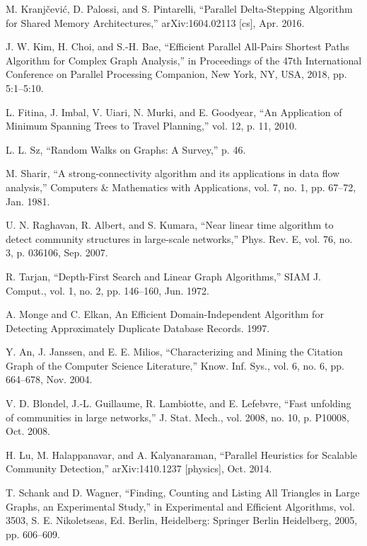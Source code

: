\documentclass[journal,twoside,web]{ieeecolor}
\begin{document}
\begin{thebibliography}{9}
    M. Kranjčević, D. Palossi, and S. Pintarelli, “Parallel Delta-Stepping Algorithm for Shared Memory Architectures,” arXiv:1604.02113 [cs], Apr. 2016.
    
    J. W. Kim, H. Choi, and S.-H. Bae, “Efficient Parallel All-Pairs Shortest Paths Algorithm for Complex Graph Analysis,” in Proceedings of the 47th International Conference on Parallel Processing Companion, New York, NY, USA, 2018, pp. 5:1–5:10.
    
    L. Fitina, J. Imbal, V. Uiari, N. Murki, and E. Goodyear, “An Application of Minimum Spanning Trees to Travel Planning,” vol. 12, p. 11, 2010.
    
    L. L. Sz, “Random Walks on Graphs: A Survey,” p. 46.
    
    M. Sharir, “A strong-connectivity algorithm and its applications in data flow analysis,” Computers \& Mathematics with Applications, vol. 7, no. 1, pp. 67–72, Jan. 1981.
    
    U. N. Raghavan, R. Albert, and S. Kumara, “Near linear time algorithm to detect community structures in large-scale networks,” Phys. Rev. E, vol. 76, no. 3, p. 036106, Sep. 2007.
    
    R. Tarjan, “Depth-First Search and Linear Graph Algorithms,” SIAM J. Comput., vol. 1, no. 2, pp. 146–160, Jun. 1972.
    
    A. Monge and C. Elkan, An Efficient Domain-Independent Algorithm for Detecting Approximately Duplicate Database Records. 1997.
    
    Y. An, J. Janssen, and E. E. Milios, “Characterizing and Mining the Citation Graph of the Computer Science Literature,” Know. Inf. Sys., vol. 6, no. 6, pp. 664–678, Nov. 2004.
    
    V. D. Blondel, J.-L. Guillaume, R. Lambiotte, and E. Lefebvre, “Fast unfolding of communities in large networks,” J. Stat. Mech., vol. 2008, no. 10, p. P10008, Oct. 2008.
    
    H. Lu, M. Halappanavar, and A. Kalyanaraman, “Parallel Heuristics for Scalable Community Detection,” arXiv:1410.1237 [physics], Oct. 2014.
    
    T. Schank and D. Wagner, “Finding, Counting and Listing All Triangles in Large Graphs, an Experimental Study,” in Experimental and Efficient Algorithms, vol. 3503, S. E. Nikoletseas, Ed. Berlin, Heidelberg: Springer Berlin Heidelberg, 2005, pp. 606–609.
    

\end{thebibliography}
\end{document}
